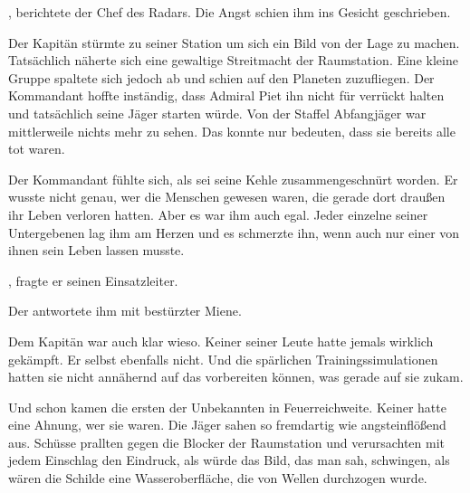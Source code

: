 \par

, berichtete der Chef des Radars. Die Angst schien ihm ins Gesicht geschrieben. 

\par

Der Kapitän stürmte zu seiner Station um sich ein Bild von der Lage zu machen. Tatsächlich näherte sich eine gewaltige Streitmacht der Raumstation. Eine kleine Gruppe spaltete sich jedoch ab und schien auf den Planeten zuzufliegen. Der Kommandant hoffte inständig, dass Admiral Piet ihn nicht für verrückt halten und tatsächlich seine Jäger starten würde. Von der Staffel Abfangjäger war mittlerweile nichts mehr zu sehen. Das konnte nur bedeuten, dass sie bereits alle tot waren.

\par

Der Kommandant fühlte sich, als sei seine Kehle zusammengeschnürt worden. Er wusste nicht genau, wer die Menschen gewesen waren, die gerade dort draußen ihr Leben verloren hatten. Aber es war ihm auch egal. Jeder einzelne seiner Untergebenen lag ihm am Herzen und es schmerzte ihn, wenn auch nur einer von ihnen sein Leben lassen musste.

\par

, fragte er seinen Einsatzleiter.

\par

Der antwortete ihm mit bestürzter Miene. 

\par

Dem Kapitän war auch klar wieso. Keiner seiner Leute hatte jemals wirklich gekämpft. Er selbst ebenfalls nicht. Und die spärlichen Trainingssimulationen hatten sie nicht annähernd auf das vorbereiten können, was gerade auf sie zukam.

\par

Und schon kamen die ersten der Unbekannten in Feuerreichweite. Keiner hatte eine Ahnung, wer sie waren. Die Jäger sahen so fremdartig wie angsteinflößend aus. Schüsse prallten gegen die Blocker der Raumstation und verursachten mit jedem Einschlag den Eindruck, als würde das Bild, das man sah, schwingen, als wären die Schilde eine Wasseroberfläche, die von Wellen durchzogen wurde.

